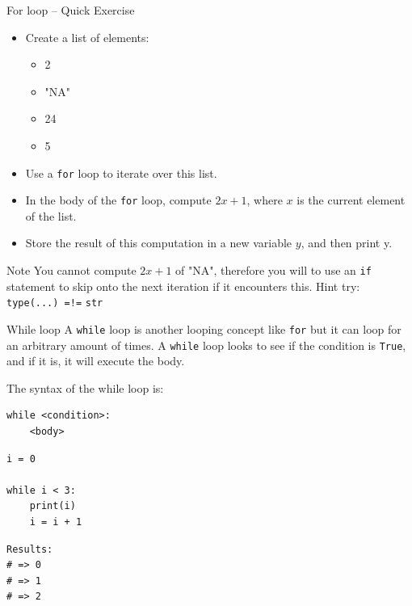 \documentclass[10pt]{beamer}
\begin{document}
\begin{frame}[label={sec:org4625161},fragile]{For loop -- Quick Exercise}
 \begin{itemize}
\item Create a list of elements:

\begin{itemize}
\item 2
\item "NA"
\item 24
\item 5
\end{itemize}

\item Use a \texttt{for} loop to iterate over this list.
\item In the body of the \texttt{for} loop, compute \(2x + 1\), where \(x\) is the current element of
the list.
\item Store the result of this computation in a new variable \(y\), and then print y.
\end{itemize}

\alert{Note} You cannot compute \(2x + 1\) of "NA", therefore you will to use an \texttt{if} statement
to skip onto the next iteration if it encounters this. \alert{Hint} try: \texttt{type(...) =!=} \texttt{str}
\end{frame}

\begin{frame}[label={sec:org04c6848},fragile]{While loop}
 A \texttt{while} loop is another looping concept like \texttt{for} but it can loop for an arbitrary
amount of times. A \texttt{while} loop looks to see if the condition is \texttt{True}, and if it is, it
will execute the body.

The syntax of the while loop is:

\begin{verbatim}
while <condition>:
    <body>
\end{verbatim}

\begin{verbatim}
i = 0

while i < 3:
    print(i)
    i = i + 1
\end{verbatim}

\begin{verbatim}
Results: 
# => 0
# => 1
# => 2
\end{verbatim}
\end{frame}
\end{document}

